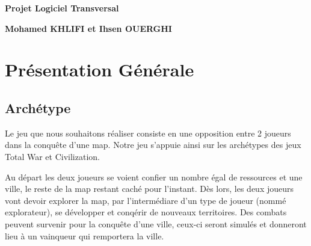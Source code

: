 \documentclass[a4paper,12pt]{article}
\begin{document}
\thispagestyle{empty}

\begin{titlepage}

\vspace*{2cm}

\begin{center}\textbf{\Huge Projet Logiciel Transversal}\end{center}{\Large \par}

\begin{center}\textbf{\large Mohamed KHLIFI et Ihsen OUERGHI}\end{center}{\large \par}

\vspace{2cm}


\clearpage

{\small
\tableofcontents
}

\end{titlepage}

\clearpage
\section{Présentation Générale}

\subsection{Archétype}

\vspace{1\baselineskip}


Le jeu que  nous souhaitons réaliser consiste en une opposition entre 2 joueurs dans la conquête d’une map. Notre jeu s’appuie ainsi sur les archétypes des jeux Total War et Civilization. 

Au départ les deux joueurs se voient confier un nombre égal de ressources et une ville, le reste de la map restant caché pour l'instant. Dès lors, les deux joueurs vont devoir explorer la map, par l'intermédiare d'un type de joueur (nommé explorateur), se développer et conqérir de nouveaux territoires. Des combats peuvent survenir pour la conquête d'une ville, ceux-ci seront simulés et donneront lieu à un vainqueur qui remportera la ville.
\end{document}
